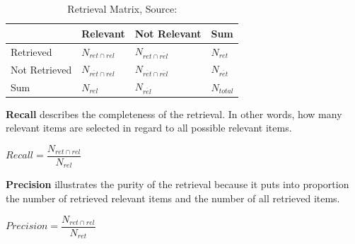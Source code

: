 \begin{table}[!h]
	\centering
	\begin{tabular}{|l||l|l|l|}
		\hline
		& Relevant & Not Relevant & Sum \\ \hline
		Retrieved     &     $N_{ret\cap rel}$     &     $N_{ret\cap \overline{rel}}$            &     $N_{ret}$  \\ \hline
		Not Retrieved &      $N_{\overline{ret}\cap rel}$      &      $N_{\overline{ret}\cap \overline{rel}}$          &    $N_{\overline{ret}}$   \\\hline
		Sum           &         $N_{rel}$   &      $N_{\overline{rel}}$          &    $N_{total}$   \\ \hline
		
	\end{tabular}
\caption{Retrieval Matrix, Source: \cite{PrecisionRecall}}
    \label{tab:PrecRecall}
    
\end{table}

\pagebreak

\noindent
\textbf{Recall} describes the completeness of the retrieval. In other words, how many relevant items are selected in regard to all possible relevant items.

\begin{centering}
	\vspace{1cm}
	
	$Recall=\dfrac{N_{ret\cap rel}}{ N_{rel} }  $
	
	\vspace{1cm}
\end{centering} 

\noindent
\textbf{Precision} illustrates the purity of the retrieval because it puts into proportion the number of retrieved relevant items and the number of all retrieved items.

\begin{centering}
	\vspace{1cm}
	
	$Precision=\dfrac{N_{ret\cap rel}}{ N_{ret} }  $
	
	\vspace{1cm}
\end{centering} 

